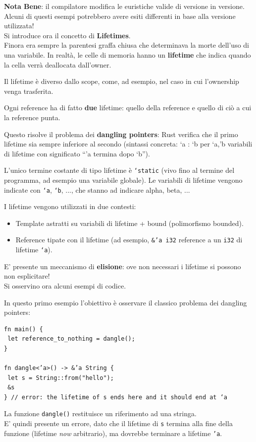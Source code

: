 \documentclass{article}
\begin{document}
\textbf{Nota Bene}: il compilatore modifica le euristiche valide di versione in versione. Alcuni di questi esempi potrebbero avere esiti differenti in base alla versione utilizzata!\vspace{14pt}\\
Si introduce ora il concetto di \textbf{Lifetimes}.\\
Finora era sempre la parentesi graffa chiusa che determinava la morte dell'uso di una variabile. In realtà, le celle di memoria hanno un \textbf{lifetime} che indica quando la cella verrà deallocata dall’owner.

Il lifetime è diverso dallo scope, come, ad esempio, nel caso in cui l’ownership venga trasferita.

Ogni reference ha di fatto \textbf{due} lifetime: quello della reference e quello di ciò a cui la reference punta.

Questo risolve il problema dei \textbf{dangling pointers}: Rust verifica che il primo lifetime sia sempre inferiore al secondo (sintassi concreta: ‘a : ‘b per ‘a,’b variabili di lifetime con significato “’a termina dopo ‘b”).

L’unico termine costante di tipo lifetime è \texttt{‘static} (vivo fino al termine del programma, ad esempio una variabile globale). Le variabili di lifetime vengono indicate con \texttt{‘a}, \texttt{‘b}, ..., che stanno ad indicare alpha, beta, ...

I lifetime vengono utilizzati in due contesti:
\begin{itemize}
    \item Template astratti su variabili di lifetime + bound (polimorfismo bounded).
    \item Reference tipate con il lifetime (ad esempio, \texttt{\&’a i32} reference a un \texttt{i32} di lifetime \texttt{‘a}).
\end{itemize}

E' presente un meccanismo di \textbf{elisione}: ove non necessari i lifetime si possono non esplicitare!\vspace{14pt}\\
Si osservino ora alcuni esempi di codice.

In questo primo esempio l'obiettivo è osservare il classico problema dei dangling pointers:
\begin{tcolorbox}
\begin{verbatim}
fn main() {
 let reference_to_nothing = dangle();
}

fn dangle<’a>() -> &’a String {
 let s = String::from("hello");
 &s
} // error: the lifetime of s ends here and it should end at ‘a
\end{verbatim}
\end{tcolorbox}
La funzione \texttt{dangle()} restituisce un riferimento ad una stringa.\\
E' quindi presente un errore, dato che il lifetime di \texttt{s} termina alla fine della funzione (lifetime \textit{now} arbitrario), ma dovrebbe terminare a lifetime \texttt{'a}.\vspace{8pt}
\end{document}
